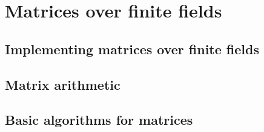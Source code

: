 
\chapter{Matrices over finite fields}

\section{Implementing matrices over finite fields}


\section{Matrix arithmetic}

\section{Basic algorithms for matrices}

